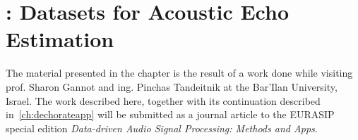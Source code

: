 \chapter{: Datasets for Acoustic Echo Estimation}\label{ch:dechorate}



\vspace{-2.5em}
  \synopsisChDechorate


\mynewline
The material presented in the chapter is the result of a work done while visiting prof. Sharon Gannot and ing. Pinchas Tandeitnik at the Bar'Ilan University, Israel.
The work described here, together with its continuation described in~\cref{ch:dechorateapp} will be submitted as a journal article to the EURASIP special edition \textit{Data-driven Audio Signal Processing: Methods and Apps}.


